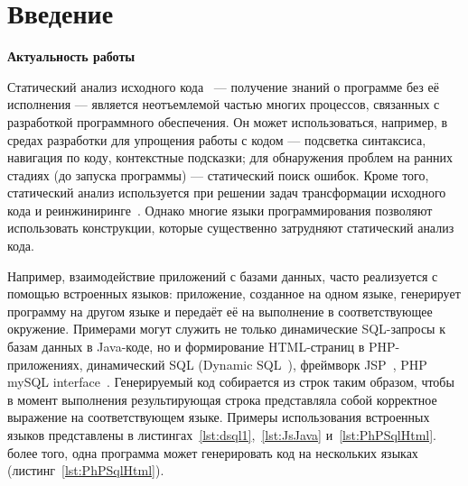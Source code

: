 \chapter*{Введение}                         %
\textbf{Актуальность работы}

Статический анализ исходного кода~\cite{StaticCodeAnalysis3,StaticCodeAnalysis2,StaticCodeAnalysis1} --- получение знаний о программе без её исполнения --- является неотъемлемой частью многих процессов, связанных с разработкой программного обеспечения. Он может использоваться, например, в средах разработки для упрощения работы с кодом --- подсветка синтаксиса, навигация по коду, контекстные подсказки; для обнаружения проблем на ранних стадиях (до запуска программы) --- статический поиск ошибок.  Кроме того, статический анализ используется при решении задач трансформации исходного кода и реинжиниринге~\cite{reengANT}. Однако многие языки программирования позволяют использовать конструкции, которые существенно затрудняют статический анализ кода.

Например, взаимодействие приложений с базами данных, часто реализуется с помощью встроенных языков: приложение, созданное на одном языке, генерирует программу на другом языке и передаёт её на выполнение в соответствующее окружение. Примерами могут служить не только динамические SQL-запросы к базам данных в Java-коде, но и формирование HTML-страниц в PHP-приложениях, динамический SQL (Dynamic SQL~\cite{DSQLISO}), фреймворк JSP~\cite{JSP}, PHP mySQL interface~\cite{PHPmySQL}. Генерируемый код собирается из строк таким образом, чтобы в момент выполнения результирующая строка представляла собой корректное выражение на соответствующем языке. Примеры использования встроенных языков представлены в листингах~\ref{lst:dsql1},~\ref{lst:JsJava} и~\ref{lst:PhPSqlHtml}. более того, одна программа может генерировать код на нескольких языках (листинг~\ref{lst:PhPSqlHtml}).

